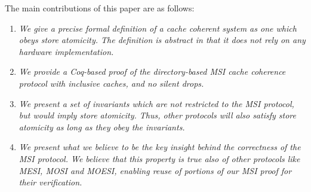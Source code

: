 The main contributions of this paper are as follows:
\begin{enumerate}
\item \emph{We give a precise formal definition of a cache coherent system as one
which obeys store atomicity. The definition is abstract in that it does not
rely on any hardware implementation.}
\item \emph{We provide a Coq-based proof of the directory-based MSI cache coherence
protocol with inclusive caches, and no silent drops.}
\item \emph{We present a set of invariants which are not restricted to the MSI
protocol, but would imply store atomicity. Thus, other protocols will also
satisfy store atomicity as long as they obey the invariants.}
\item \emph{We present what we believe to be the key insight behind the
correctness of the MSI protocol. We believe that this property is true also of
other protocols like MESI, MOSI and MOESI, enabling reuse of portions of our
MSI proof for their verification.}
\end{enumerate}
%

